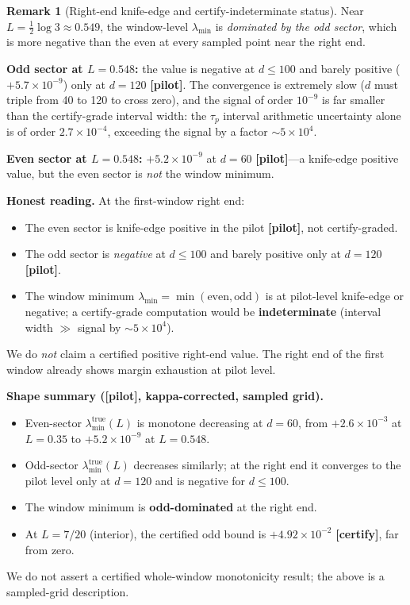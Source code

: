 \documentclass[12pt,a4paper]{amsart}
\theoremstyle{plain}
\theoremstyle{definition}
\newtheorem{remark}[theorem]{Remark}
\newcommand{\ltrue}{\lambda_{\min}^{\mathrm{true}}}
\newcommand{\certify}{\textbf{[certify]}}
\newcommand{\pilot}{\textbf{[pilot]}}
\begin{document}
\begin{remark}[Right-end knife-edge and certify-indeterminate status]
\label{rem:right-end}
Near $L = \tfrac12\log 3 \approx 0.549$, the window-level $\lambda_{\min}$
is \emph{dominated by the odd sector}, which is more negative than the even at
every sampled point near the right end.

\textbf{Odd sector at $L=0.548$:} the value is negative at $d\le 100$ and
barely positive ($+5.7\times10^{-9}$) only at $d=120$ \pilot.  The
convergence is extremely slow ($d$ must triple from 40 to 120 to cross zero),
and the signal of order $10^{-9}$ is far smaller than the certify-grade
interval width: the $\tau_p$ interval arithmetic uncertainty alone is of order
$2.7\times10^{-4}$, exceeding the signal by a factor $\sim 5\times10^4$.

\textbf{Even sector at $L=0.548$:} $+5.2\times10^{-9}$ at $d=60$ \pilot---a
knife-edge positive value, but the even sector is \emph{not} the window minimum.

\textbf{Honest reading.}  At the first-window right end:
\begin{itemize}[leftmargin=2em]
  \item The even sector is knife-edge positive in the pilot \pilot, not certify-graded.
  \item The odd sector is \emph{negative} at $d \le 100$ and barely positive only
    at $d=120$ \pilot.
  \item The window minimum $\lambda_{\min} = \min(\text{even},\text{odd})$ is
    at pilot-level knife-edge or negative; a certify-grade computation would be
    \textbf{indeterminate} (interval width $\gg$ signal by $\sim 5\times10^4$).
\end{itemize}
We do \emph{not} claim a certified positive right-end value.  The right end of
the first window already shows margin exhaustion at pilot level.
\end{remark}

\textbf{Shape summary (\pilot, kappa-corrected, sampled grid).}
\begin{itemize}[leftmargin=2em]
  \item Even-sector $\ltrue(L)$ is monotone decreasing at $d=60$, from
    $+2.6\times10^{-3}$ at $L=0.35$ to $+5.2\times10^{-9}$ at $L=0.548$.
  \item Odd-sector $\ltrue(L)$ decreases similarly; at the right end it
    converges to the pilot level only at $d=120$ and is negative for $d\le 100$.
  \item The window minimum is \textbf{odd-dominated} at the right end.
  \item At $L=7/20$ (interior), the certified odd bound is
    $+4.92\times10^{-2}$ \certify, far from zero.
\end{itemize}
We do not assert a certified whole-window monotonicity result; the above is a
sampled-grid description.
\end{document}
